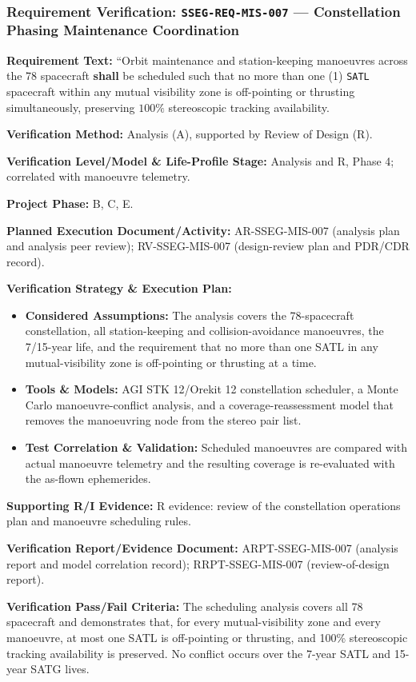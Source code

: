 \subsubsection{Requirement Verification: \texttt{SSEG-REQ-MIS-007} --- Constellation Phasing Maintenance Coordination}
\label{ver:SSEG-REQ-MIS-007}
\textbf{Requirement Text:} ``Orbit maintenance and station-keeping manoeuvres across the 78 spacecraft \textbf{shall} be scheduled such that no more than one (1) \texttt{SATL} spacecraft within any mutual visibility zone is off-pointing or thrusting simultaneously, preserving $100\%$ stereoscopic tracking availability.
\par\textbf{Verification Method:} Analysis (A), supported by Review of Design (R).
\par\textbf{Verification Level/Model \& Life-Profile Stage:} Analysis and R, Phase 4; correlated with manoeuvre telemetry.
\par\textbf{Project Phase:} B, C, E.
\par\textbf{Planned Execution Document/Activity:} AR-SSEG-MIS-007 (analysis plan and analysis peer review); RV-SSEG-MIS-007 (design-review plan and PDR/CDR record).
\par\textbf{Verification Strategy \& Execution Plan:}
\begin{itemize}
\item \textbf{Considered Assumptions:} The analysis covers the 78-spacecraft constellation, all station-keeping and collision-avoidance manoeuvres, the 7/15-year life, and the requirement that no more than one SATL in any mutual-visibility zone is off-pointing or thrusting at a time.
\item \textbf{Tools \& Models:} AGI STK 12/Orekit 12 constellation scheduler, a Monte Carlo manoeuvre-conflict analysis, and a coverage-reassessment model that removes the manoeuvring node from the stereo pair list.
\item \textbf{Test Correlation \& Validation:} Scheduled manoeuvres are compared with actual manoeuvre telemetry and the resulting coverage is re-evaluated with the as-flown ephemerides.
\end{itemize}
\par\textbf{Supporting R/I Evidence:} R evidence: review of the constellation operations plan and manoeuvre scheduling rules.
\par\textbf{Verification Report/Evidence Document:} ARPT-SSEG-MIS-007 (analysis report and model correlation record); RRPT-SSEG-MIS-007 (review-of-design report).
\par\textbf{Verification Pass/Fail Criteria:} The scheduling analysis covers all 78 spacecraft and demonstrates that, for every mutual-visibility zone and every manoeuvre, at most one SATL is off-pointing or thrusting, and 100\% stereoscopic tracking availability is preserved. No conflict occurs over the 7-year SATL and 15-year SATG lives.
\par\medskip
